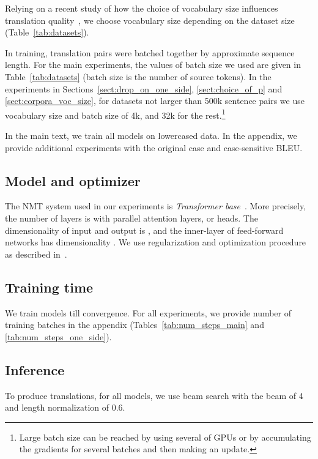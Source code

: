 \documentclass[11pt,a4paper]{article}
\begin{document}
Relying on a recent study of how the choice of vocabulary size influences translation quality~\cite{lowresBPE}, we choose vocabulary size depending on the dataset size (Table~\ref{tab:datasets}). 

In training, translation pairs  were  batched  together  by  approximate  sequence length. For the main experiments, the values of batch size we used are given in Table~\ref{tab:datasets} (batch size is the number of source tokens). In the experiments in Sections~\ref{sect:drop_on_one_side}, \ref{sect:choice_of_p} and \ref{sect:corpora_voc_size}, for datasets not larger than 500k sentence pairs we use vocabulary size and batch size of 4k, and 32k for the rest.\footnote{Large batch size can be reached by using several of GPUs or by accumulating the gradients for several batches and then making an update.}

In the main text, we train all models on lowercased data. In the appendix, we provide additional experiments with the original case and case-sensitive BLEU.




\subsection{Model and optimizer}
\label{sect:model_parameters}

The NMT system used in our experiments is {\it Transformer base}~\cite{transformer}.  More precisely, the number of layers is  with  parallel attention layers, or heads. The dimensionality of input and output is , and the inner-layer of feed-forward networks has dimensionality . We use regularization and optimization procedure as described in~\citet{transformer}. 


\subsection{Training time}

We train models till convergence. For all experiments, we provide number of training batches  in the appendix (Tables~\ref{tab:num_steps_main} and \ref{tab:num_steps_one_side}).

\subsection{Inference}

To produce translations, for all models,  we use beam search with the beam of 4 and length normalization of 0.6.
\end{document}

